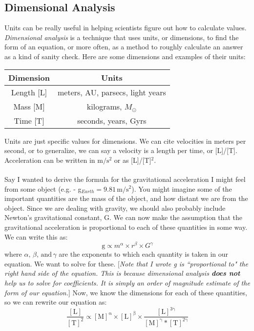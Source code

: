 \documentclass[11pt]{article}
\begin{document}
\subsection{Dimensional Analysis}
Units can be really useful in helping scientists figure out how to calculate values. \textit{Dimensional analysis} is a technique that uses units, or dimensions, to find the form of an equation, or more often, as a method to roughly calculate an answer as a kind of sanity check.  Here are some dimensions and examples of their units:
\\
\begin{center}
    \begin{tabular}{c | c} 
    Dimension & Units \\
    \hline
    Length [L] & meters, AU, parsecs, light years\\
    Mass [M] & kilograms, $M_\odot$\\
    Time [T] & seconds, years, Gyrs
    \end{tabular}
\end{center}
\noindent
Units are just specific values for dimensions.  We can cite velocities in meters per second, or to generalize, we can say a velocity is a length per time, or [L]/[T].  Acceleration can be written in $\mathrm{m/s^2}$ or as [L]/[T]$^2$.
\\ \\ \noindent
Say I wanted to derive the formula for the gravitational acceleration I might feel from some object (e.g. - g$_{Earth} = 9.81 \, \mathrm{m/s^2}$).  You might imagine some of the important quantities are the mass of the object, and how distant we are from the object.  Since we are dealing with gravity, we should also probably include Newton's gravitational constant, G.  We can now make the assumption that the gravitational acceleration is proportional to each of these quantities in some way.  We can write this as:
$$\mathrm{g} \propto m^\alpha \times r^\beta \times G^\gamma$$ where $\alpha, \, \beta, \, \mathrm{and} \, \gamma$ are the exponents to which each quantity is taken in our equation.  We want to solve for these.  [\textit{Note that I wrote g is ``proportional to" the right hand side of the equation.  This is because dimensional analysis \textbf{does not} help us to solve for coefficients.  It is simply an order of magnitude estimate of the form of our equation.}] Now, we know the dimensions for each of these quantities, so we can rewrite our equation as:
$$\mathrm{\frac{[L]}{[T]^2}} \propto \mathrm{[M]^\alpha} \times \mathrm{[L]^\beta} \times \mathrm{\frac{[L]^{3\gamma}}{[M]^\gamma*[T]^{2\gamma}}}$$
\end{document}
